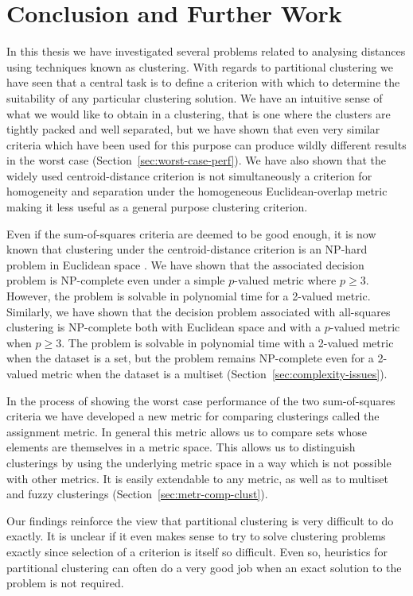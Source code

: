 \chapter{Conclusion and Further Work}
\label{cha:conclusion}

In this thesis we have investigated several problems related to analysing
distances using techniques known as clustering.  With regards to partitional
clustering we have seen that a central task is to define a criterion with
which to determine the suitability of any particular clustering solution.  We
have an intuitive sense of what we would like to obtain in a clustering, that
is one where the clusters are tightly packed and well separated, but we have
shown that even very similar criteria which have been used for this purpose
can produce wildly different results in the worst case
(Section~\ref{sec:worst-case-perf}).  We have also shown that the widely used
centroid-distance criterion is not simultaneously a criterion for homogeneity
and separation under the homogeneous Euclidean-overlap metric making it less
useful as a general purpose clustering criterion.

Even if the sum-of-squares criteria are deemed to be good enough, it is now
known that clustering under the centroid-distance criterion is an NP-hard
problem in Euclidean space \cite{aloise09,mahajan09}.  We have shown that the
associated decision problem is NP-complete even under a simple $p$-valued
metric where $p \geq 3$.  However, the problem is solvable in polynomial time
for a 2-valued metric.  Similarly, we have shown that the decision problem
associated with all-squares clustering is NP-complete both with Euclidean
space and with a $p$-valued metric when $p \geq 3$.  The problem is solvable
in polynomial time with a 2-valued metric when the dataset is a set, but the
problem remains NP-complete even for a 2-valued metric when the dataset is a
multiset (Section~\ref{sec:complexity-issues}).

In the process of showing the worst case performance of the two sum-of-squares
criteria we have developed a new metric for comparing clusterings called the
assignment metric.  In general this metric allows us to compare sets whose
elements are themselves in a metric space.  This allows us to distinguish
clusterings by using the underlying metric space in a way which is not
possible with other metrics.  It is easily extendable to any metric, as well
as to multiset and fuzzy clusterings (Section~\ref{sec:metr-comp-clust}).

Our findings reinforce the view that partitional clustering is very difficult
to do exactly.  It is unclear if it even makes sense to try to solve
clustering problems exactly since selection of a criterion is itself so
difficult.  Even so, heuristics for partitional clustering can often do a very
good job when an exact solution to the problem is not required.


